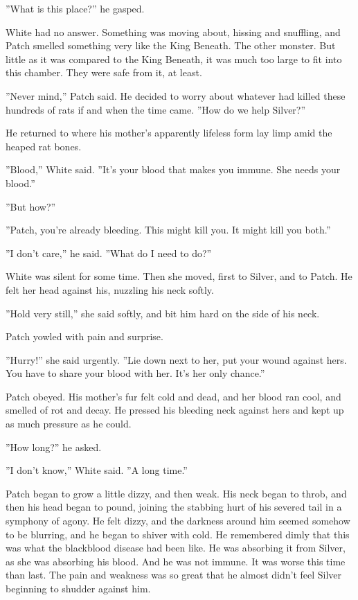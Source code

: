 \documentclass[11pt]{article}
\begin{document}
''What is this place?'' he gasped.\par
White had no answer. Something was moving about, hissing and snuffling, and Patch smelled something very like the King Beneath. The other monster. But little as it was compared to the King Beneath, it was much too large to fit into this chamber. They were safe %
 from it, at least. \par
''Never mind,'' Patch said. He decided to worry about whatever had killed these hundreds of rats if and when the time came. ''How do we help Silver?''\par
He returned to where his mother's apparently lifeless form lay limp amid the heaped rat bones.\par
''Blood,'' White said. ''It's your blood that makes you immune. She needs your blood.''\par
''But %
 how?''\par
''Patch, you're already bleeding. This might kill you. It might kill you both.''\par
''I don't care,'' he said. ''What do I need to do?''\par
White was silent for some time. Then she moved, first to Silver, and to Patch. He felt her head against his, nuzzling his neck softly.\par
''Hold very still,'' she said softly, and bit him hard on the side of his neck.\par
Patch yowled with pain and surprise.\par
''Hurry!'' she said urgently. ''Lie down next to her, put your wound against hers. You have to share your blood with her. It's her only chance.''\par
Patch obeyed. His mother's fur felt cold and dead, and her blood ran cool, and smelled of rot and decay. He pressed his bleeding neck against hers and kept up as much pressure as he could.\par
''How long?'' he asked.\par
''I don't know,'' White said. ''A long time.''\par
Patch began to grow a little dizzy, and then weak. His neck began to throb, and then his head began to pound, joining the stabbing hurt of his severed tail in a symphony of agony. He felt dizzy, and the darkness around him seemed somehow to be blurring, and he began to shiver with cold. He remembered dimly that this was what the blackblood disease had been like. He was absorbing it from Silver, as she was absorbing his blood. And he was not immune. It was worse this time than last. The pain and weakness was so great that he almost didn't feel Silver beginning to shudder against him.\par
\end{document}
